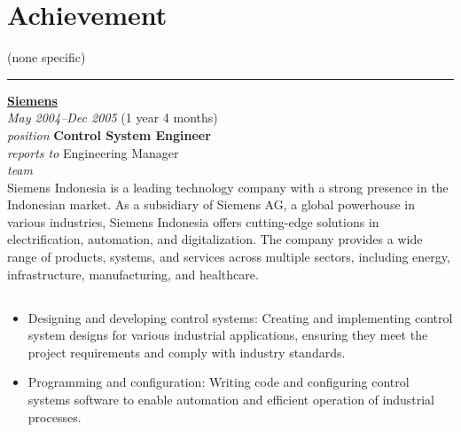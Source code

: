 \documentclass[12pt]{res}
\begin{document}
\begin{resume}
\begin{minipage}[t]{0.42\linewidth}
	\section{Achievement}
	\begin{flushleft}
        \begin{itemize}
		\footnotesize{(none specific)}
        \end{itemize}
	\end{flushleft}
\end{minipage}

\vspace{10pt}
\rule{1.0\textwidth}{0.1pt}

\begin{multicols}{2}
	{\large {\bf \href{https://siemens.co.id}{Siemens}}} \\
	{\footnotesize{\sl May 2004--Dec 2005} \hfill (1 year 4 months)}\\
	{\footnotesize{\sl position} \hfill \bf{Control System Engineer}}\\
	{\footnotesize{\sl reports to} \hfill Engineering Manager}\\
	{\footnotesize{\sl team} \hfill }\\

	\columnbreak
	{\footnotesize{Siemens Indonesia is a leading technology company with a strong presence in the Indonesian market. As a subsidiary of Siemens AG, a global powerhouse in various industries, Siemens Indonesia offers cutting-edge solutions in electrification, automation, and digitalization. The company provides a wide range of products, systems, and services across multiple sectors, including energy, infrastructure, manufacturing, and healthcare.}}\\
\end{multicols}
\vspace{-20pt}

\begin{multicols}{2}
	\section{}
		\begin{itemize}
			\item Designing and developing control systems: Creating and implementing control system designs for various industrial applications, ensuring they meet the project requirements and comply with industry standards.

\item Programming and configuration: Writing code and configuring control systems software to enable automation and efficient operation of industrial processes.


\end{itemize}
\end{multicols}
\end{resume}
\end{document}

